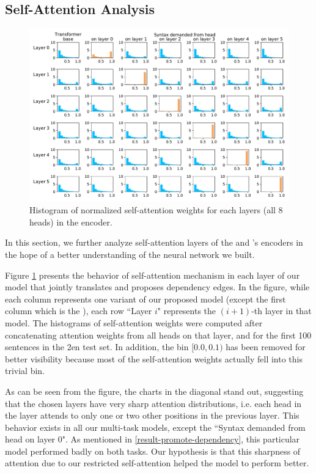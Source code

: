\subsection{Self-Attention Analysis}
\label{result-promote-analysis}

\begin{figure}[t]
	\includegraphics[width=\textwidth]{img/att_dist}
    \caption{Histogram of normalized self-attention weights for each layers (all 8 heads) in the encoder.}
    \label{fig:att_dist}
\end{figure}

In this section, we further analyze self-attention layers of the \DepParse and \DiagonalParse's encoders in the hope of a better understanding of the neural network we built.

Figure \ref{fig:att_dist} presents the behavior of self-attention mechanism in each layer of our model that jointly translates and proposes dependency edges.
In the figure, while each column represents one variant of our proposed model (except the first column which is the \transformerbase), each row ``Layer $i$" represents the $(i+1)$-th layer in that model.
The histograms of self-attention weights were computed after concatenating attention weights from all heads on that layer, and for the first 100 sentences in the \cs2en test set.
In addition, the bin $[0.0,0.1)$ has been removed for better visibility because most of the self-attention weights actually fell into this trivial bin.

As can be seen from the figure, the charts in the diagonal stand out, suggesting that the chosen layers have very sharp attention distributions, i.e. each head in the layer attends to only one or two other positions in the previous layer.
This behavior exists in all our multi-task models, except the ``Syntax demanded from head on layer 0".
As mentioned in \cref{result-promote-dependency}, this particular model performed badly on both tasks.
Our hypothesis is that this sharpness of attention due to our restricted self-attention helped the model to perform better.

